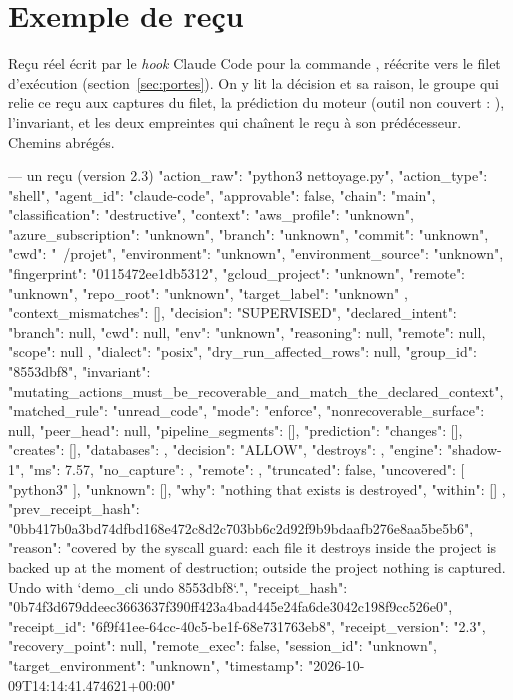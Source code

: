 \chapter{Exemple de reçu}
\label{ann:recus}

Reçu réel écrit par le \textit{hook} Claude Code pour la commande ,
réécrite vers le filet d'exécution (section~\ref{sec:portes}). On y lit la décision et sa
raison, le groupe qui relie ce reçu aux captures du filet, la prédiction du moteur (outil non
couvert : ), l'invariant, et les deux empreintes qui chaînent le reçu à son
prédécesseur. Chemins abrégés.

\begin{code}[brut]{ --- un reçu (version 2.3)}
{
  "action_raw": "python3 nettoyage.py",
  "action_type": "shell",
  "agent_id": "claude-code",
  "approvable": false,
  "chain": "main",
  "classification": "destructive",
  "context": {
    "aws_profile": "unknown",
    "azure_subscription": "unknown",
    "branch": "unknown",
    "commit": "unknown",
    "cwd": "~/projet",
    "environment": "unknown",
    "environment_source": "unknown",
    "fingerprint": "0115472ee1db5312",
    "gcloud_project": "unknown",
    "remote": "unknown",
    "repo_root": "unknown",
    "target_label": "unknown"
  },
  "context_mismatches": [],
  "decision": "SUPERVISED",
  "declared_intent": {
    "branch": null,
    "cwd": null,
    "env": "unknown",
    "reasoning": null,
    "remote": null,
    "scope": null
  },
  "dialect": "posix",
  "dry_run_affected_rows": null,
  "group_id": "8553dbf8",
  "invariant": "mutating_actions_must_be_recoverable_and_match_the_declared_context",
  "matched_rule": "unread_code",
  "mode": "enforce",
  "nonrecoverable_surface": null,
  "peer_head": null,
  "pipeline_segments": [],
  "prediction": {
    "changes": [],
    "creates": [],
    "databases": {},
    "decision": "ALLOW",
    "destroys": {},
    "engine": "shadow-1",
    "ms": 7.57,
    "no_capture": {},
    "remote": {},
    "truncated": false,
    "uncovered": [
      "python3"
    ],
    "unknown": [],
    "why": "nothing that exists is destroyed",
    "within": []
  },
  "prev_receipt_hash": "0bb417b0a3bd74dfbd168e472c8d2c703bb6c2d92f9b9bdaafb276e8aa5be5b6",
  "reason": "covered by the syscall guard: each file it destroys inside the project is backed up at the moment of destruction; outside the project nothing is captured. Undo with `demo_cli undo 8553dbf8`.",
  "receipt_hash": "0b74f3d679ddeec3663637f390ff423a4bad445e24fa6de3042c198f9cc526e0",
  "receipt_id": "6f9f41ee-64cc-40c5-be1f-68e731763eb8",
  "receipt_version": "2.3",
  "recovery_point": null,
  "remote_exec": false,
  "session_id": "unknown",
  "target_environment": "unknown",
  "timestamp": "2026-10-09T14:14:41.474621+00:00"
}
\end{code}

